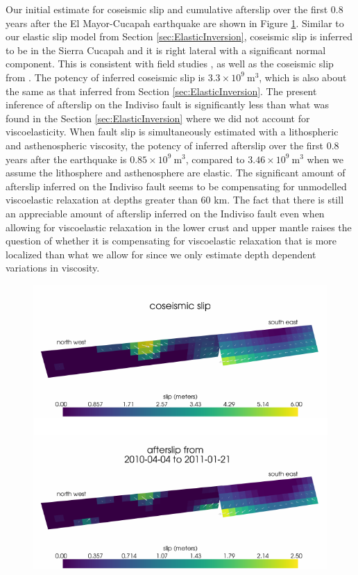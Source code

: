 \documentclass[review]{elsarticle}
\begin{document}
Our initial estimate for coseismic slip and cumulative afterslip over the first 0.8 years after the El Mayor-Cucapah earthquake are shown in Figure \ref{fig:InitialSlip}.  Similar to our elastic slip model from Section \ref{sec:ElasticInversion}, coseismic slip is inferred to be in the Sierra Cucapah and it is right lateral with a significant normal component.  This is consistent with field studies \citep{Fletcher2014}, as well as the coseismic slip from \citet{Wei2011}. The potency of inferred coseismic slip is $3.3\times 10^{9}\ \mathrm{m}^3$, which is also about the same as that inferred from Section \ref{sec:ElasticInversion}. The present inference of afterslip on the Indiviso fault is significantly less than what was found in the Section \ref{sec:ElasticInversion} where we did not account for viscoelasticity. When fault slip is simultaneously estimated with a lithospheric and asthenospheric viscosity, the potency of inferred afterslip over the first 0.8 years after the earthquake is $0.85\times 10^9\ \mathrm{m}^3$, compared to $3.46\times10^{9}\ \mathrm{m}^3$ when we assume the lithosphere and asthenosphere are elastic.  The significant amount of afterslip inferred on the Indiviso fault seems to be compensating for unmodelled viscoelastic relaxation at depths greater than $60$ km.  The fact that there is still an appreciable amount of afterslip inferred on the Indiviso fault even when allowing for viscoelastic relaxation in the lower crust and upper mantle raises the question of whether it is compensating for viscoelastic relaxation that is more localized than what we allow for since we only estimate depth dependent variations in viscosity.  

\begin{figure}
\includegraphics[scale=0.7]{Figures/InitialSlip}
\caption{}
\label{fig:InitialSlip}
\end{figure} 
\end{document}
